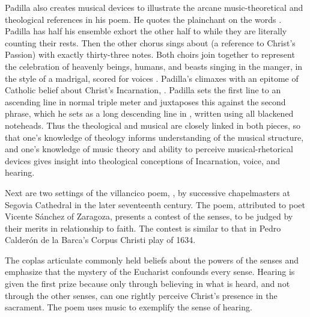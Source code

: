 Padilla also creates musical devices to illustrate the arcane music-theoretical 
and theological references in his poem.
He quotes the plainchant  on the words .
Padilla has half his ensemble exhort the other half to  while they are literally counting their rests.
Then the other chorus sings about  (a 
reference to Christ's Passion) with exactly thirty-three notes.
Both choirs join together to represent the celebration of heavenly beings, 
humans, and beasts singing in the manger, in the style of a madrigal, scored 
for voices .
Padilla's  climaxes with an epitome of Catholic belief about
Christ's Incarnation, .
Padilla sets the first line to an ascending line in normal triple meter and 
juxtaposes this against the second phrase, which he sets as a long descending 
line in , written using all blackened noteheads.
Thus the theological and musical are closely linked in both pieces, so that 
one's knowledge of theology informs understanding of the musical structure, and 
one's knowledge of music theory and ability to perceive musical-rhetorical 
devices gives insight into theological conceptions of Incarnation, voice, and
hearing.


Next are two settings of the villancico poem, , by successive chapelmasters at Segovia Cathedral in the 
later seventeenth century.%
    \Autocite[285--338]{Cashner:PhD}
The poem, attributed to poet Vicente Sánchez of Zaragoza, presents a contest 
of the senses, to be judged by their merits in relationship to faith.
The contest is similar to that in Pedro Calderón de la Barca's Corpus Christi 
play  of 1634.%
    \Autocites{Calderon:Retiro}{Cashner:FaithHearingUCSB}[52--107]{Cashner:PhD}

The coplas articulate commonly held beliefs about the powers of the senses and 
emphasize that the mystery of the Eucharist confounds every sense.
Hearing is given the first prize because only through believing in what is 
heard, and not through the other senses, can one rightly perceive Christ's 
presence in the sacrament.
The poem uses music to exemplify the sense of hearing.

